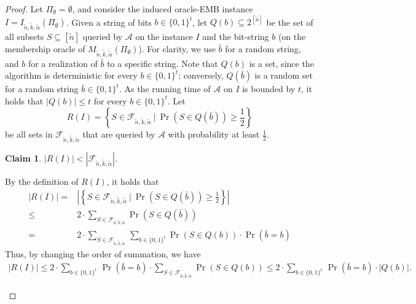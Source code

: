 \documentclass[11pt,letter]{article}
\newcommand{\cA}{{\mathcal{A}}}
\newtheorem{claim}[lemma]{Claim}
\begin{document}
\begin{proof}
		 
		 Let $\Pi_{\emptyset} = \emptyset$, and consider the induced oracle-EMB instance $I = I_{\tilde{n},\tilde{k},\tilde{\alpha}}(\Pi_{\emptyset})$. Given a string of bits $b \in \{0,1\}^{t}$, let $Q(b) \subseteq 2^{[\tilde{n}]}$ be the set of  all subsets $S \subseteq [\tilde{n}]$ queried by $\cA$ on the instance $I$ and the bit-string $b$ (on the membership oracle of $M_{\tilde{n},\tilde{k},\tilde{\alpha}}(\Pi_{\emptyset})$). For clarity, we use $\bar{b}$ for a random string, and $b$ for a realization of $\bar{b}$ to a specific string. Note that $Q(b)$ is a set, since the algorithm is deterministic for every $b \in \{0,1\}^{t}$; conversely, $Q(\bar{b})$ is a random set for a random string $\bar{b} \in \{0,1\}^{t}$. As the running time of $\cA$ on %
		$I$ is bounded by $t$, it holds that $|Q(b)| \leq t$ for every $b \in \{0,1\}^{t}$. Let 
		\begin{equation*}
			\label{eq:R}
			R(I) = \left\{S \in \mathcal{F}_{\tilde{n},\tilde{k},\tilde{\alpha}}~\bigg|~\Pr \left(S \in Q(\bar{b}) \right) \geq \frac{1}{2} \right\}
		\end{equation*} be all sets in $ \mathcal{F}_{\tilde{n},\tilde{k},\tilde{\alpha}}$ that are queried by $\cA$ with probability  at least $\frac{1}{2}$. 
			\begin{claim}
			\label{claim:H3}
			$|R(I)|  < |\mathcal{F}_{\tilde{n},\tilde{k},\tilde{\alpha}}|$. 
		\end{claim}
		\begin{claimproof}
			By the definition of $R(I)$, it holds that 
				\begin{equation*}
				\label{eq:R0}
				\begin{aligned}
					|R(I)| ={} & \left| \left\{S \in \mathcal{F}_{\tilde{n},\tilde{k},\tilde{\alpha}}~\bigg|~\Pr \left(S \in Q(\bar{b}) \right) \geq \frac{1}{2} \right\} \right| \\
					\leq{} & 2 \cdot \sum_{S \in \mathcal{F}_{\tilde{n},\tilde{k},\tilde{\alpha}}} \Pr \left(S \in Q(\bar{b}) \right)  \\
					={} & 	 2 \cdot \sum_{S \in \mathcal{F}_{\tilde{n},\tilde{k},\tilde{\alpha}}~} \sum_{b \in \{0,1\}^{t}} \Pr \left(S \in Q(b) \right) \cdot \Pr(\bar{b} = b)
				\end{aligned}
			\end{equation*} Thus, by changing the order of summation, we have 
				\begin{equation*}
				\begin{aligned}
					|R(I)| \leq 2 \cdot  \sum_{b \in \{0,1\}^{t}~} \Pr(\bar{b} = b) \cdot \sum_{S \in \mathcal{F}_{\tilde{n},\tilde{k},\tilde{\alpha}}} \Pr \left(S \in Q(b) \right) 
					\leq 2 \cdot  \sum_{b \in \{0,1\}^{t}~} \Pr(\bar{b} = b) \cdot |Q(b)| .
				\end{aligned}
			\end{equation*} 
			

\end{claimproof}
\end{proof}
\end{document}
